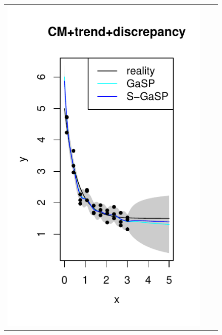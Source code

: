\begin{figure}[t]
\begin{tabular}{ccc}
	\hspace{-.3in} \includegraphics[scale=.7]{figures/Bayarri_2007_math_model_discrepancy.pdf}

\end{tabular}
\end{figure}
